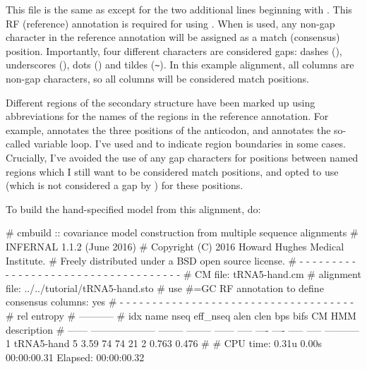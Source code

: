 This file is the same as  except for the two
additional lines beginning with . This RF (reference)
annotation is required for using . When 
is used, any non-gap character in the reference annotation will be
assigned as a match (consensus) position. Importantly, four different
characters are considered gaps: dashes (\otext{-}), underscores
(\otext{\_}), dots () and tildes (\verb+~+). In this example
alignment, all columns are non-gap characters, so all columns will be
considered match positions.

Different regions of the secondary structure have been marked up using
abbreviations for the names of the regions in the reference
annotation. For example,  annotates the three positions of
the anticodon, and \otext{[vlp]} annotates the so-called variable
loop. I've used \otext{[} and \otext{]} to indicate region boundaries
in some cases. Crucially, I've avoided the use of any gap characters
for positions between named regions which I still want to be
considered match positions, and opted to use \otext{=} (which is not
considered a gap by ) for these positions.

To build the hand-specified model from this alignment, do:


\begin{sreoutput}
# cmbuild :: covariance model construction from multiple sequence alignments
# INFERNAL 1.1.2 (June 2016)
# Copyright (C) 2016 Howard Hughes Medical Institute.
# Freely distributed under a BSD open source license.
# - - - - - - - - - - - - - - - - - - - - - - - - - - - - - - - - - - - -
# CM file:                                            tRNA5-hand.cm
# alignment file:                                     ../../tutorial/tRNA5-hand.sto
# use #=GC RF annotation to define consensus columns: yes
# - - - - - - - - - - - - - - - - - - - - - - - - - - - - - - - - - - - -
#                                                                      rel entropy
#                                                                      -----------
# idx    name                     nseq eff_nseq   alen  clen  bps bifs    CM   HMM description
# ------ -------------------- -------- -------- ------ ----- ---- ---- ----- ----- -----------
       1 tRNA5-hand                  5     3.59     74    74   21    2 0.763 0.476 
#
# CPU time: 0.31u 0.00s 00:00:00.31 Elapsed: 00:00:00.32
\end{sreoutput}

